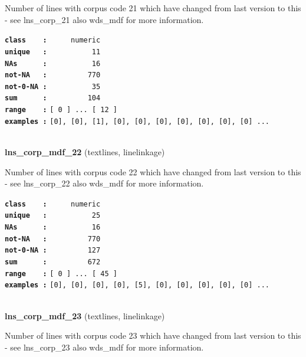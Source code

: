 \documentclass[]{article}
\begin{document}
Number of lines with corpus code 21 which have changed from last version
to this - see lns\_corp\_21 also wds\_mdf for more information.

\textbf{\texttt{class\ \ \ \ :}} \texttt{~~~~~numeric}\\
\textbf{\texttt{unique\ \ \ :}} \texttt{~~~~~~~~~~11}\\
\textbf{\texttt{NAs\ \ \ \ \ \ :}} \texttt{~~~~~~~~~~16}\\
\textbf{\texttt{not-NA\ \ \ :}} \texttt{~~~~~~~~~770}\\
\textbf{\texttt{not-0-NA\ :}} \texttt{~~~~~~~~~~35}\\
\textbf{\texttt{sum\ \ \ \ \ \ :}} \texttt{~~~~~~~~~104}\\
\textbf{\texttt{range\ \ \ \ :}}
\texttt{{[}\ 0\ {]}\ ...\ {[}\ 12\ {]}}\\
\textbf{\texttt{examples\ :}}
\texttt{{[}0{]},\ {[}0{]},\ {[}1{]},\ {[}0{]},\ {[}0{]},\ {[}0{]},\ {[}0{]},\ {[}0{]},\ {[}0{]},\ {[}0{]}\ ...}\\

~

\textbf{lns\_corp\_mdf\_22} (textlines, linelinkage)

Number of lines with corpus code 22 which have changed from last version
to this - see lns\_corp\_22 also wds\_mdf for more information.

\textbf{\texttt{class\ \ \ \ :}} \texttt{~~~~~numeric}\\
\textbf{\texttt{unique\ \ \ :}} \texttt{~~~~~~~~~~25}\\
\textbf{\texttt{NAs\ \ \ \ \ \ :}} \texttt{~~~~~~~~~~16}\\
\textbf{\texttt{not-NA\ \ \ :}} \texttt{~~~~~~~~~770}\\
\textbf{\texttt{not-0-NA\ :}} \texttt{~~~~~~~~~127}\\
\textbf{\texttt{sum\ \ \ \ \ \ :}} \texttt{~~~~~~~~~672}\\
\textbf{\texttt{range\ \ \ \ :}}
\texttt{{[}\ 0\ {]}\ ...\ {[}\ 45\ {]}}\\
\textbf{\texttt{examples\ :}}
\texttt{{[}0{]},\ {[}0{]},\ {[}0{]},\ {[}0{]},\ {[}5{]},\ {[}0{]},\ {[}0{]},\ {[}0{]},\ {[}0{]},\ {[}0{]}\ ...}\\

~

\textbf{lns\_corp\_mdf\_23} (textlines, linelinkage)

Number of lines with corpus code 23 which have changed from last version
to this - see lns\_corp\_23 also wds\_mdf for more information.
\end{document}
